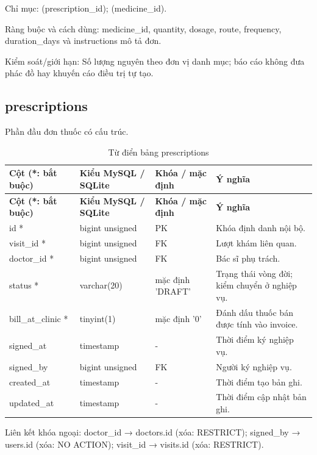 Chỉ mục:\allowbreak{} (prescription\_\allowbreak{}id); (medicine\_\allowbreak{}id).\allowbreak{}

Ràng buộc và cách dùng:\allowbreak{} medicine\_\allowbreak{}id, quantity, dosage, route, frequency, duration\_\allowbreak{}days và instructions mô tả đơn.\allowbreak{}

Kiểm soát/\allowbreak{}giới hạn:\allowbreak{} Số lượng nguyên theo đơn vị danh mục; báo cáo không đưa phác đồ hay khuyến cáo điều trị tự tạo.\allowbreak{}

\clearpage

\subsection{prescriptions}
Phần đầu đơn thuốc có cấu trúc.\allowbreak{}


{\fontsize{10}{12}\selectfont\setlength{\tabcolsep}{3pt}\renewcommand{\arraystretch}{1.12}
\begin{longtable}{@{}L{\textwidth-4.86pt\relax} L{\textwidth-3.96pt\relax} L{\textwidth-2.88pt\relax} L{\textwidth-6.3pt\relax}@{}}
\caption{Từ điển bảng prescriptions}\\
\toprule
\textbf{Cột (*:\allowbreak{} bắt buộc)} & \textbf{Kiểu My\allowbreak{}SQL /\allowbreak{} SQLite} & \textbf{Khóa /\allowbreak{} mặc định} & \textbf{Ý nghĩa}\\\midrule
\endfirsthead
\toprule
\textbf{Cột (*:\allowbreak{} bắt buộc)} & \textbf{Kiểu My\allowbreak{}SQL /\allowbreak{} SQLite} & \textbf{Khóa /\allowbreak{} mặc định} & \textbf{Ý nghĩa}\\\midrule
\endhead
\bottomrule\endlastfoot
id * & bigint unsigned & PK & Khóa định danh nội bộ.\allowbreak{}\\[1pt]
visit\_\allowbreak{}id * & bigint unsigned & FK & Lượt khám liên quan.\allowbreak{}\\[1pt]
doctor\_\allowbreak{}id * & bigint unsigned & FK & Bác sĩ phụ trách.\allowbreak{}\\[1pt]
status * & varchar(20) & mặc định 'DRAFT' & Trạng thái vòng đời; kiểm chuyển ở nghiệp vụ.\allowbreak{}\\[1pt]
bill\_\allowbreak{}at\_\allowbreak{}clinic * & tinyint(1) & mặc định '0' & Đánh dấu thuốc bán được tính vào invoice.\allowbreak{}\\[1pt]
signed\_\allowbreak{}at & timestamp & - & Thời điểm ký nghiệp vụ.\allowbreak{}\\[1pt]
signed\_\allowbreak{}by & bigint unsigned & FK & Người ký nghiệp vụ.\allowbreak{}\\[1pt]
created\_\allowbreak{}at & timestamp & - & Thời điểm tạo bản ghi.\allowbreak{}\\[1pt]
updated\_\allowbreak{}at & timestamp & - & Thời điểm cập nhật bản ghi.\allowbreak{}\\[1pt]
\end{longtable}}
Liên kết khóa ngoại:\allowbreak{} doctor\_\allowbreak{}id → doctors.\allowbreak{}id (xóa:\allowbreak{} RESTRICT); signed\_\allowbreak{}by → users.\allowbreak{}id (xóa:\allowbreak{} NO ACTION); visit\_\allowbreak{}id → visits.\allowbreak{}id (xóa:\allowbreak{} RESTRICT).\allowbreak{}

